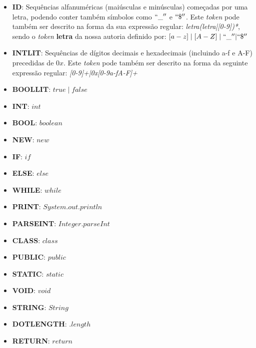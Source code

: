 \documentclass[11pt,a4paper]{article}
\begin{document}
	\begin{itemize}
	\item \textbf{ID}: Sequências alfanuméricas (maiúsculas e minúsculas) começadas por uma letra, podendo conter também símbolos como $``\_''$ e $``\$''$. Este \emph{token} pode também ser descrito na forma da sua expressão regular: \emph{{letra}({letra}|{[0-9]})*}, sendo o \emph{token} \textbf{letra} da nossa autoria definido por: $[a-z] \mid [A-Z] \mid ``\_''|``\$''$
	
	\item \textbf{INTLIT}: Sequências de dígitos decimais e hexadecimais (incluindo a-f e A-F) precedidas de $0x$. Este \emph{token} pode também ser descrito na forma da seguinte expressão regular: \emph{{[0-9]}+|0x[0-9a-fA-F]+}
	
	\item \textbf{BOOLLIT}: $true \mid false$
	
	\item \textbf{INT}: $int$
	
	\item \textbf{BOOL}: $boolean$
	
	\item \textbf{NEW}: $new$
	
	\item \textbf{IF}: $if$
	
	\item \textbf{ELSE}: $else$
	
	\item \textbf{WHILE}: $while$
	
	\item \textbf{PRINT}: $System.out.println$
	
	\item \textbf{PARSEINT}: $Integer.parseInt$
	
	\item \textbf{CLASS}: $class$
	
	\item \textbf{PUBLIC}: $public$
	
	\item \textbf{STATIC}: $static$
	
	\item \textbf{VOID}: $void$
	
	\item \textbf{STRING}: $String$
	
	\item \textbf{DOTLENGTH}: $.length$
	
	\item \textbf{RETURN}: $return$
	

\end{itemize}
\end{document}
